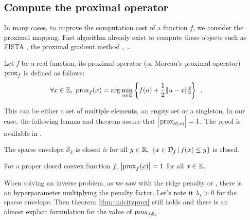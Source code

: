 
\subsection[Proximal operator]{Compute the proximal operator}

In many cases, to improve the computation cost of a function $f$, we consider the proximal mapping. Fast algorithm already exist to compute these objects such as FISTA \cite{beck2009fast}, the proximal gradient method \cite{ryu2017proximal}, \dots

\begin{definition}\label{def:prox}
Let $f$ be a real function, its proximal operator (or Moreau's proximal operator) $\operatorname{prox}_f$ is defined as follows:
\[\forall x\in\mathbb{E},\ \operatorname{prox}_f(x) =\arg\min_{u\in \mathbb{E}}\left\{f(u) + \frac{1}{2}\|u-x\|^2_2\right\}\enspace.\] 
\end{definition}

This can be either a set of multiple elements, an empty set or a singleton. In our case, the following lemma and theorem assure that $\left|\operatorname{prox}_{\mathcal{S}(x)}\right| = 1$. The proof is available in \cite{beck}.

\begin{lemma}
The sparse envelope $\mathcal{S}_k$ is closed \emph{ie} for all $y \in \RR,\ \left\{x\in \mathcal{D}_f\, |\, f(x)\leq y\right\}$ is closed.
\end{lemma}
\begin{theorem}\label{thm:unicityprox}
For a proper closed convex function $f$, $\left|\operatorname{prox}_f(x)\right| = 1$ for all $x\in\mathbb{E}$.
\end{theorem}

When solving an inverse problem, as we saw with the ridge penalty or \enet, there is an hyperparameter multiplying the penalty factor. Let's note it $\lambda_s>0$ for the sparse envelope. Then theorem \ref{thm:unicityprox} still holds and there is an almost explicit formulation for the value of $\operatorname{prox}_{\lambda\mathcal{S}_k}$.

